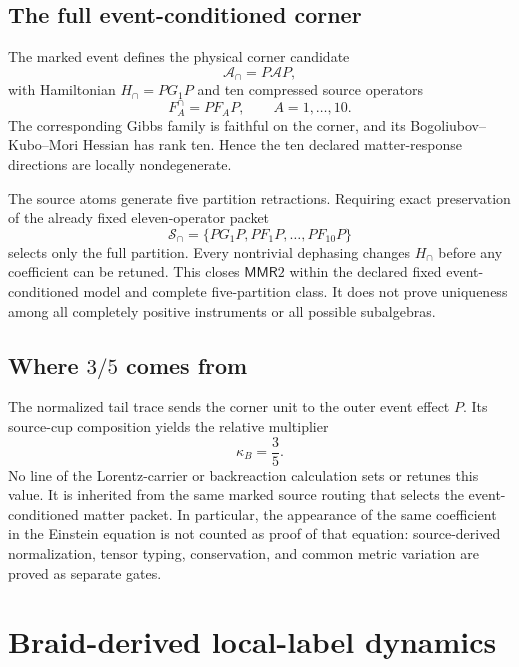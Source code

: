 \documentclass[11pt]{article}
\theoremstyle{definition}
\theoremstyle{remark}
\newcommand{\cA}{\mathcal{A}}
\newcommand{\cS}{\mathcal{S}}
\newcommand{\MMR}{\mathsf{MMR}}
\begin{document}
\subsection{The full event-conditioned corner}

The marked event defines the physical corner candidate
\begin{equation}
 \cA_{\cap}=P\cA P,
\end{equation}
with Hamiltonian $H_{\cap}=PG_1P$ and ten compressed source operators
\begin{equation}
 F_A^{\cap}=PF_AP,\qquad A=1,\ldots,10.
\end{equation}
The corresponding Gibbs family is faithful on the corner, and its Bogoliubov--Kubo--Mori Hessian has rank ten. Hence the ten declared matter-response directions are locally nondegenerate.

The source atoms generate five partition retractions. Requiring exact preservation of the already fixed eleven-operator packet
\begin{equation}
 \cS_{\cap}=\{PG_1P,PF_1P,\ldots,PF_{10}P\}
\end{equation}
selects only the full partition. Every nontrivial dephasing changes $H_{\cap}$ before any coefficient can be retuned. This closes $\MMR2$ within the declared fixed event-conditioned model and complete five-partition class. It does not prove uniqueness among all completely positive instruments or all possible subalgebras.

\subsection{Where $3/5$ comes from}

The normalized tail trace sends the corner unit to the outer event effect $P$. Its source-cup composition yields the relative multiplier
\begin{equation}
 \kappa_B=\frac35.
\end{equation}
No line of the Lorentz-carrier or backreaction calculation sets or retunes this value. It is inherited from the same marked source routing that selects the event-conditioned matter packet. In particular, the appearance of the same coefficient in the Einstein equation is not counted as proof of that equation: source-derived normalization, tensor typing, conservation, and common metric variation are proved as separate gates.

\section{Braid-derived local-label dynamics}
\end{document}

